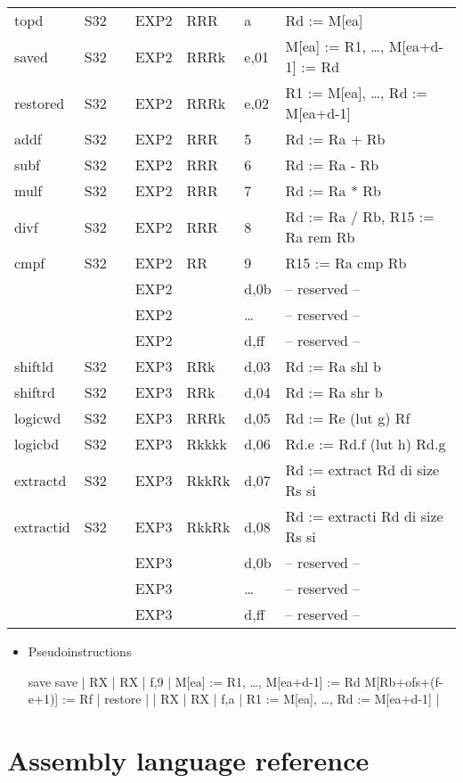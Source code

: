 \documentclass[11pt]{article}
\begin{document}
\begin{center}
\begin{tabular}{lllllll}
topd & S32 &  & EXP2 & RRR & a & Rd := M[ea]\\
saved & S32 &  & EXP2 & RRRk & e,01 & M[ea] := R1, \ldots{}, M[ea+d-1] := Rd\\
restored & S32 &  & EXP2 & RRRk & e,02 & R1 := M[ea], \ldots{}, Rd := M[ea+d-1]\\
addf & S32 &  & EXP2 & RRR & 5 & Rd := Ra + Rb\\
subf & S32 &  & EXP2 & RRR & 6 & Rd := Ra - Rb\\
mulf & S32 &  & EXP2 & RRR & 7 & Rd := Ra * Rb\\
divf & S32 &  & EXP2 & RRR & 8 & Rd := Ra / Rb, R15 := Ra rem Rb\\
cmpf & S32 &  & EXP2 & RR & 9 & R15 := Ra cmp Rb\\
 &  &  & EXP2 &  & d,0b & -- reserved --\\
 &  &  & EXP2 &  & \ldots{} & -- reserved --\\
 &  &  & EXP2 &  & d,ff & -- reserved --\\
\hline
shiftld & S32 &  & EXP3 & RRk & d,03 & Rd := Ra shl b\\
shiftrd & S32 &  & EXP3 & RRk & d,04 & Rd := Ra shr b\\
logicwd & S32 &  & EXP3 & RRRk & d,05 & Rd := Re (lut g) Rf\\
logicbd & S32 &  & EXP3 & Rkkkk & d,06 & Rd.e := Rd.f (lut h) Rd.g\\
extractd & S32 &  & EXP3 & RkkRk & d,07 & Rd := extract Rd di size Rs si\\
extractid & S32 &  & EXP3 & RkkRk & d,08 & Rd := extracti Rd di size Rs si\\
 &  &  & EXP3 &  & d,0b & -- reserved --\\
 &  &  & EXP3 &  & \ldots{} & -- reserved --\\
 &  &  & EXP3 &  & d,ff & -- reserved --\\
\hline
\hline
\end{tabular}
\end{center}

\begin{itemize}
\item Pseudoinstructions
\label{sec:org9c555c9}

save  
save     |       RX   | RX    | f,9  | M[ea] := R1, \ldots{}, M[ea+d-1] := Rd  M[Rb+ofs+(f-e+1)] := Rf |
restore  |   | RX   | RX    | f,a  | R1 := M[ea], \ldots{}, Rd := M[ea+d-1] |
\end{itemize}

\section*{Assembly language reference}
\label{sec:orgf8aca18}
\end{document}
